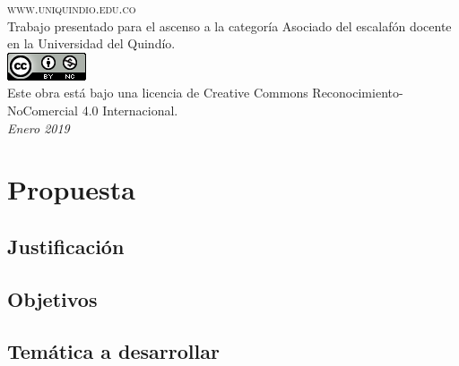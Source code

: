 \documentclass[12pt,fleqn, twoside, letter]{book}
\numberwithin{equation}{section} %
\numberwithin{figure}{section} %
\numberwithin{table}{section} %
\begin{document}
\noindent \textsc{www.uniquindio.edu.co}\\

\noindent Trabajo presentado para el ascenso a la categoría Asociado del escalafón docente en la Universidad del Quindío.\\ 


\includegraphics[]{Pictures/cc-88x31.png}\\
\noindent Este obra está bajo una licencia de Creative Commons Reconocimiento-NoComercial 4.0 Internacional.\\

\noindent \textit{Enero 2019} 

\newpage



\pagestyle{empty} %
\tableofcontents %
\cleardoublepage %
\pagestyle{fancy} %

\part{Propuesta}\label{Parte1}

\chapter{Justificación}\label{justificacion}


\chapter{Objetivos}\label{Objetivos}


\chapter{Temática a desarrollar}\label{tematicaADesarrollar}

\end{document}
